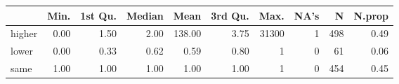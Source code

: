 \begin{table}[ht]
\centering
\begin{tabular}{lrrrrrrrrr}
  \hline
 & Min. & 1st Qu. & Median & Mean & 3rd Qu. & Max. & NA's & N & N.prop \\ 
  \hline
higher & 0.00 & 1.50 & 2.00 & 138.00 & 3.75 & 31300 &   1 & 498 & 0.49 \\ 
  lower & 0.00 & 0.33 & 0.62 & 0.59 & 0.80 &   1 &   0 &  61 & 0.06 \\ 
  same & 1.00 & 1.00 & 1.00 & 1.00 & 1.00 &   1 &   0 & 454 & 0.45 \\ 
   \hline
\end{tabular}
\end{table}
